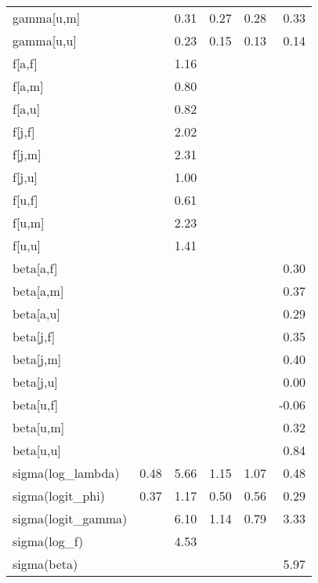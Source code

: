 \begin{table}[ht]
\begin{tabular}{lrrrrr}
  gamma[u,m] &  & 0.31 & 0.27 & 0.28 & 0.33 \\ 
  gamma[u,u] &  & 0.23 & 0.15 & 0.13 & 0.14 \\ 
  f[a,f] &  & 1.16 &  &  &  \\ 
  f[a,m] &  & 0.80 &  &  &  \\ 
  f[a,u] &  & 0.82 &  &  &  \\ 
  f[j,f] &  & 2.02 &  &  &  \\ 
  f[j,m] &  & 2.31 &  &  &  \\ 
  f[j,u] &  & 1.00 &  &  &  \\ 
  f[u,f] &  & 0.61 &  &  &  \\ 
  f[u,m] &  & 2.23 &  &  &  \\ 
  f[u,u] &  & 1.41 &  &  &  \\ 
  beta[a,f] &  &  &  &  & 0.30 \\ 
  beta[a,m] &  &  &  &  & 0.37 \\ 
  beta[a,u] &  &  &  &  & 0.29 \\ 
  beta[j,f] &  &  &  &  & 0.35 \\ 
  beta[j,m] &  &  &  &  & 0.40 \\ 
  beta[j,u] &  &  &  &  & 0.00 \\ 
  beta[u,f] &  &  &  &  & -0.06 \\ 
  beta[u,m] &  &  &  &  & 0.32 \\ 
  beta[u,u] &  &  &  &  & 0.84 \\ 
  sigma(log\_lambda) & 0.48 & 5.66 & 1.15 & 1.07 & 0.48 \\ 
  sigma(logit\_phi) & 0.37 & 1.17 & 0.50 & 0.56 & 0.29 \\ 
  sigma(logit\_gamma) &  & 6.10 & 1.14 & 0.79 & 3.33 \\ 
  sigma(log\_f) &  & 4.53 &  &  &  \\ 
  sigma(beta) &  &  &  &  & 5.97 \\ 
   \hline
\end{tabular}
\endgroup
\end{table}
